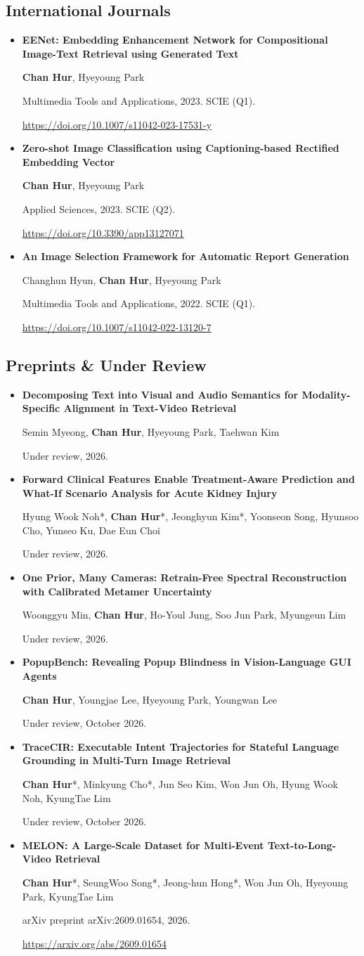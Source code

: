 \documentclass[10pt,a4paper]{article}
\newcommand{\me}{\textbf{Chan Hur}}
\newcommand{\cvpub}[3]{%
  \item\begin{minipage}[t]{\linewidth}
    \textbf{#1}\par
    #2\par
    #3\par
  \end{minipage}}
\begin{document}
\subsection{International Journals}
\begin{itemize}
\cvpub{EENet: Embedding Enhancement Network for Compositional Image-Text Retrieval using Generated Text}
  {\me, Hyeyoung Park}
  {Multimedia Tools and Applications, 2023. SCIE (Q1).
   \par\url{https://doi.org/10.1007/s11042-023-17531-y}}
\cvpub{Zero-shot Image Classification using Captioning-based Rectified Embedding Vector}
  {\me, Hyeyoung Park}
  {Applied Sciences, 2023. SCIE (Q2).
   \par\url{https://doi.org/10.3390/app13127071}}
\cvpub{An Image Selection Framework for Automatic Report Generation}
  {Changhun Hyun, \me, Hyeyoung Park}
  {Multimedia Tools and Applications, 2022. SCIE (Q1).
   \par\url{https://doi.org/10.1007/s11042-022-13120-7}}

\end{itemize}

\subsection{Preprints \& Under Review}
\begin{itemize}
\cvpub{Decomposing Text into Visual and Audio Semantics for Modality-Specific Alignment in Text-Video Retrieval}
  {Semin Myeong, \me, Hyeyoung Park, Taehwan Kim}
  {Under review, 2026.}
\cvpub{Forward Clinical Features Enable Treatment-Aware Prediction and What-If Scenario Analysis for Acute Kidney Injury}
  {Hyung Wook Noh*, \me*, Jeonghyun Kim*, Yoonseon Song, Hyunsoo Cho, Yunseo Ku, Dae Eun Choi}
  {Under review, 2026.}
\cvpub{One Prior, Many Cameras: Retrain-Free Spectral Reconstruction with Calibrated Metamer Uncertainty}
  {Woonggyu Min, \me, Ho-Youl Jung, Soo Jun Park, Myungeun Lim}
  {Under review, 2026.}
\cvpub{PopupBench: Revealing Popup Blindness in Vision-Language GUI Agents}
  {\me, Youngjae Lee, Hyeyoung Park, Youngwan Lee}
  {Under review, October 2026.}
\cvpub{TraceCIR: Executable Intent Trajectories for Stateful Language Grounding in Multi-Turn Image Retrieval}
  {\me*, Minkyung Cho*, Jun Seo Kim, Won Jun Oh, Hyung Wook Noh, KyungTae Lim}
  {Under review, October 2026.}
\cvpub{MELON: A Large-Scale Dataset for Multi-Event Text-to-Long-Video Retrieval}
  {\me*, SeungWoo Song*, Jeong-hun Hong*, Won Jun Oh, Hyeyoung Park, KyungTae Lim}
  {arXiv preprint arXiv:2609.01654, 2026.
   \par\url{https://arxiv.org/abs/2609.01654}}

\end{itemize}
\end{document}
